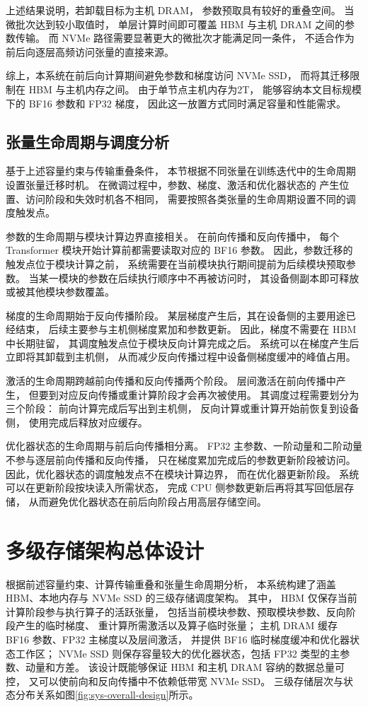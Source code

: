 \documentclass[bachelor,openany,oneside,color,AutoFakeBold=true]{buaathesis}
\begin{document}
上述结果说明，若卸载目标为主机 DRAM，
参数预取具有较好的重叠空间。
当微批次达到较小取值时，
单层计算时间即可覆盖 HBM 与主机 DRAM 之间的参数传输。
而 NVMe 路径需要显著更大的微批次才能满足同一条件，
不适合作为前后向逐层高频访问张量的直接来源。

综上，本系统在前后向计算期间避免参数和梯度访问 NVMe SSD，
而将其迁移限制在 HBM 与主机内存之间。
由于单节点主机内存为2T，
能够容纳本文目标规模下的 BF16 参数和 FP32 梯度，
因此这一放置方式同时满足容量和性能需求。

\subsection{张量生命周期与调度分析}

基于上述容量约束与传输重叠条件，
本节根据不同张量在训练迭代中的生命周期设置张量迁移时机。
在微调过程中，参数、梯度、激活和优化器状态的
产生位置、访问阶段和失效时机各不相同，
需要按照各类张量的生命周期设置不同的调度触发点。

参数的生命周期与模块计算边界直接相关。
在前向传播和反向传播中，
每个 Transformer 模块开始计算前都需要读取对应的 BF16 参数。
因此，参数迁移的触发点位于模块计算之前，
系统需要在当前模块执行期间提前为后续模块预取参数。
当某一模块的参数在后续执行顺序中不再被访问时，
其设备侧副本即可释放或被其他模块参数覆盖。

梯度的生命周期始于反向传播阶段。
某层梯度产生后，其在设备侧的主要用途已经结束，
后续主要参与主机侧梯度累加和参数更新。
因此，梯度不需要在 HBM 中长期驻留，
其调度触发点位于模块反向计算完成之后。
系统可以在梯度产生后立即将其卸载到主机侧，
从而减少反向传播过程中设备侧梯度缓冲的峰值占用。

激活的生命周期跨越前向传播和反向传播两个阶段。
层间激活在前向传播中产生，
但要到对应反向传播或重计算阶段才会再次被使用。
其调度过程需要划分为三个阶段：
前向计算完成后写出到主机侧，
反向计算或重计算开始前恢复到设备侧，
使用完成后释放对应缓存。

优化器状态的生命周期与前后向传播相分离。
FP32 主参数、一阶动量和二阶动量
不参与逐层前向传播和反向传播，
只在梯度累加完成后的参数更新阶段被访问。
因此，优化器状态的调度触发点不在模块计算边界，
而在优化器更新阶段。
系统可以在更新阶段按块读入所需状态，
完成 CPU 侧参数更新后再将其写回低层存储，
从而避免优化器状态在前后向阶段占用高层存储空间。


\section{多级存储架构总体设计}
根据前述容量约束、计算传输重叠和张量生命周期分析，
本系统构建了涵盖 HBM、本地内存与 NVMe SSD 的三级存储调度架构。
其中，
HBM 仅保存当前计算阶段参与执行算子的活跃张量，
包括当前模块参数、预取模块参数、反向阶段产生的临时梯度、
重计算所需激活以及算子临时张量；
主机 DRAM 缓存 BF16 参数、FP32 主梯度以及层间激活，
并提供 BF16 临时梯度缓冲和优化器状态工作区；
NVMe SSD 则保存容量较大的优化器状态，包括 FP32 类型的主参数、动量和方差。
该设计既能够保证 HBM 和主机 DRAM 容纳的数据总量可控，
又可以使前向和反向传播中不依赖低带宽 NVMe SSD。
三级存储层次与状态分布关系如图\ref{fig:sys-overall-design}所示。
\end{document}
